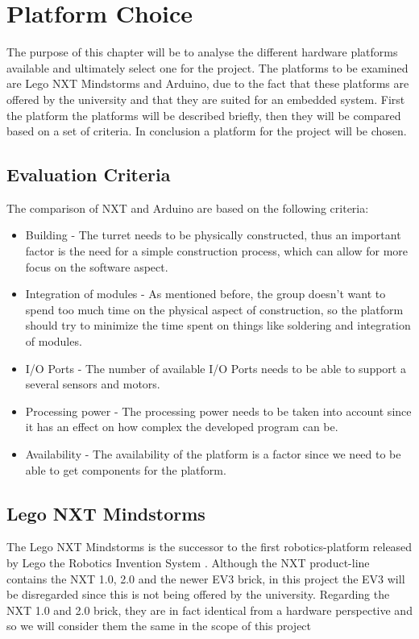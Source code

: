 \chapter{Platform Choice}\label{PlatformC}

The purpose of this chapter will be to analyse the different hardware platforms available
and ultimately select one for the project. The platforms to be examined are Lego
NXT Mindstorms and Arduino, due to the fact that these platforms are offered by
the university and that they are suited for an embedded system.
First the platform the platforms will be described briefly, then they will be
compared based on a set of criteria. In conclusion a platform for the project
will be chosen.

\section{Evaluation Criteria}
The comparison of NXT and Arduino are based on the following criteria:

\begin{itemize}
  \item Building - The turret needs to be physically constructed, thus an
  important factor is the need for a simple construction process, which can
  allow for more focus on the software aspect.
  \item Integration of modules - As mentioned before, the group doesn't want to spend too
  much time on the physical aspect of construction, so the platform should try to minimize
  the time spent on things like soldering and integration of modules.
  \item I/O Ports - The number of available I/O Ports needs to be able to
  support a several sensors and motors.
  \item Processing power - The processing power needs to be taken into account
  since it has an effect on how complex the developed program can be.
  \item Availability - The availability of the platform is a factor since we
  need to be able to get components for the platform.
\end{itemize}

\section{Lego NXT Mindstorms}
The Lego NXT Mindstorms is the successor to the first robotics-platform released
by Lego the Robotics Invention System \citep{NXTHistory}. Although the NXT
product-line contains the NXT 1.0, 2.0 and the newer EV3 brick, in this project
the EV3 will be disregarded since this is not being offered by the university.
Regarding the NXT 1.0 and 2.0 brick, they are in fact identical from a hardware
perspective and so we will consider them the same in the scope of this project
\citep{NXTversions}\nl


